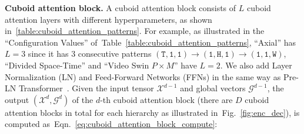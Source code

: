 \documentclass{article}
\newcommand{\tabref}[1]{Table~\ref{#1}}
\newcommand{\figref}[1]{Fig.~\ref{#1}}
\newcommand{\eqnref}[1]{Eqn.~\ref{#1}}
\renewcommand{\paragraph}[1]{\textbf{#1. }}
\begin{document}
 \paragraph{Cuboid attention block}
 A cuboid attention block consists of $L$ cuboid attention layers with different hyperparameters, as shown in~\ref{table:cuboid_attention_patterns}. For example, as illustrated in the ``Configuration Values'' of~\tabref{table:cuboid_attention_patterns}, ``Axial'' has $L=3$ since it has $3$ consecutive patterns $\mathtt{(T, 1, 1)\rightarrow (1, H, 1)\rightarrow (1, 1, W)}$, ``Divided Space-Time'' and ``Video Swin $P\times M$'' have $L=2$. We also add Layer Normalization (LN) and Feed-Forward Networks (FFNs) in the same way as Pre-LN Transformer~\cite{xiong2020layer}. Given the input tensor $\mathcal{X}^{d-1}$ and global vectors $\mathcal{G}^{d-1}$, the output $(\mathcal{X}^{d}, \mathcal{G}^{d})$ of the $d$-th cuboid attention block (there are $D$ cuboid attention blocks in total for each hierarchy as illustrated in~\figref{fig:enc_dec}), is computed as~\eqnref{eq:cuboid_attention_block_compute}:
 
\end{document}
